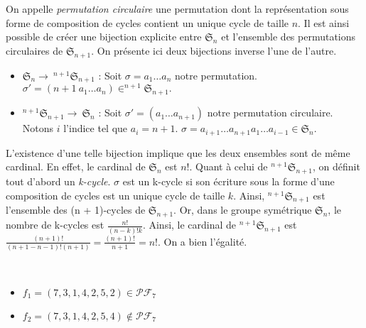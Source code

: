 \begin{example}
On appelle \emph{permutation circulaire} une permutation dont la
représentation sous forme de composition de cycles contient un unique cycle
de taille $n$. Il est ainsi possible de créer une bijection explicite entre
$\mathfrak{S}_n$ et l'ensemble des permutations circulaires de
$\mathfrak{S}_{n+1}.$
On présente ici deux bijections inverse l'une de l'autre.
\begin{itemize}
    \item $\mathfrak{S}_n \to\ ^{n+1}\mathfrak{S}_{n+1}$ :
    Soit $\sigma = a_1 \ldots a_n$ notre permutation.
    $\sigma' = (n+1 \ a_1 \ldots a_n) \in ^{n+1}\mathfrak{S}_{n+1}.$
    \item $^{n+1}\mathfrak{S}_{n+1} \to\ \mathfrak{S}_n$ :
    Soit $\sigma' = (a_1 \ldots a_{n+1})$ notre permutation circulaire.
    Notons $i$ l'indice tel que $a_i = n + 1$.
    $\sigma = a_{i+1} \ldots a_{n+1} a_1 \ldots a_{i-1} \in \mathfrak{S}_n.$
\end{itemize}
L'existence d'une telle bijection implique que les deux ensembles sont de
même cardinal.
En effet, le cardinal de $\mathfrak{S}_n$ est $n!$. Quant à celui de
$^{n+1}\mathfrak{S}_{n+1}$, on définit tout d'abord un \emph{k-cycle}.
$\sigma$ est un k-cycle si son écriture sous la forme d'une composition de
cycles est un unique cycle de taille $k$. Ainsi, $^{n+1}\mathfrak{S}_{n+1}$
est l'ensemble des (n + 1)-cycles de $\mathfrak{S}_{n+1}$.
Or, dans le groupe symétrique $\mathfrak{S}_{n}$, le nombre de k-cycles est
$\displaystyle \frac{n!}{(n-k)!k}$.
Ainsi, le cardinal de $^{n+1}\mathfrak{S}_{n+1}$ est
$\displaystyle \frac{(n+1)!}{(n+1-n-1)!(n+1)} = \frac{(n+1)!}{n+1} = n!$.
On a bien l'égalité.\\
\end{example}

\begin{example}[Définition 1 : $n = 7$]
    ~
    \begin{itemize}
        \item $f_1 = (7, 3, 1, 4, 2, 5, 2) \in \mathcal{PF}_7$
        \item $f_2 = (7, 3, 1, 4, 2, 5, 4) \notin \mathcal{PF}_7$
    \end{itemize}
\end{example}


